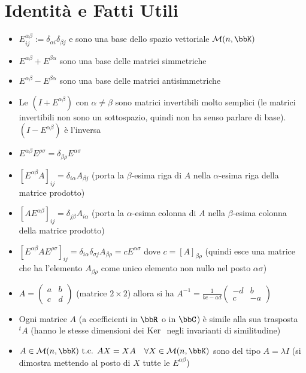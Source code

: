 \documentclass[a4paper,NoNotes,GeneralMath]{stdmdoc}
\begin{document}
	\section*{Identità e Fatti Utili}
	\begin{itemize}
		\item $E_{ij}^{\alpha\beta} := \delta_{\alpha i} \delta_{\beta j}$ e sono una base dello spazio vettoriale $\mathcal{M}(n,\bbK)$
		\item $E^{\alpha\beta} + E^{\beta\alpha}$ sono una base delle matrici simmetriche
		\item $E^{\alpha\beta} - E^{\beta\alpha}$ sono una base delle matrici antisimmetriche
		\item Le $(I + E^{\alpha\beta})$ con $\alpha \neq \beta$ sono matrici invertibili molto semplici (le matrici invertibili non sono un sottospazio, quindi non ha senso parlare di base). $(I - E^{\alpha\beta})$ è l'inversa
		\item $E^{\alpha\beta}E^{\rho\sigma} = \delta_{\beta\rho} E^{\alpha\sigma}$
		\item $[E^{\alpha\beta}A]_{ij} = \delta_{i\alpha}A_{\beta j}$ (porta la $\beta$-esima riga di $A$ nella $\alpha$-esima riga della matrice prodotto)
		\item $[AE^{\alpha\beta}]_{ij} = \delta_{j\beta}A_{i\alpha}$ (porta la $\alpha$-esima colonna di $A$ nella $\beta$-esima colonna della matrice prodotto)
		\item $[E^{\alpha\beta}AE^{\rho\sigma}]_{ij} = \delta_{i\alpha}\delta_{\sigma j}A_{\beta\rho} = cE^{\alpha\sigma}$ dove $c = [A]_{\beta\rho}$ (quindi esce una matrice che ha l'elemento $A_{\beta\rho}$ come unico elemento non nullo nel posto $\alpha\sigma$)
		\item $A = \left( \begin{array}{cc} a & b \\ c & d \end{array} \right)$ (matrice $2\times 2$) allora si ha $A^{-1} = \frac{1}{bc-ad} \left( \begin{array}{cc} -d & b \\ c & -a \end{array} \right)$
		\item Ogni matrice $A$ (a coefficienti in $\bbR$ o in $\bbC$) è simile alla sua trasposta ${}^tA$ (hanno le stesse dimensioni dei $\mbox{Ker }$ negli invarianti di similitudine)
		\item $A \in \mathcal{M}(n, \bbK) \tc AX = XA \quad \forall X \in \mathcal{M}(n, \bbK)$ sono del tipo $A = \lambda I$ (si dimostra mettendo al posto di $X$ tutte le $E^{\alpha\beta}$)

\end{itemize}
\end{document}
